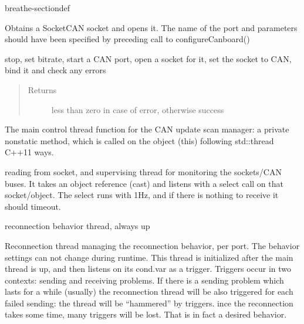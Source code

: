 \documentclass[a4paper,10pt,english]{sphinxmanual}
\begin{document}
\begin{fulllineitems}
\begin{sphinxuseclass}{breathe-sectiondef}
\begin{fulllineitems}
\end{fulllineitems}



\begin{fulllineitems}
%
\pysigstartmultiline
{}%
\pysigstopmultiline
\sphinxAtStartPar
Obtains a SocketCAN socket and opens it. The name of the port and parameters should have been specified by preceding call to configureCanboard()

\sphinxAtStartPar

stop, set bitrate, start a CAN port, open a socket for it, set the socket to CAN, bind it and check any errors 
\begin{quote}\begin{description}
\item[{Returns}] \leavevmode
\sphinxAtStartPar
less than zero in case of error, otherwise success

\end{description}\end{quote}

\end{fulllineitems}



\begin{fulllineitems}
%
\pysigstartmultiline
{}%
\pysigstopmultiline
\sphinxAtStartPar
The main control thread function for the CAN update scan manager: a private non\sphinxhyphen{}static method, which is called on the object (this) following std::thread C++11 ways.

\sphinxAtStartPar
reading from socket, and supervising thread for monitoring the sockets/CAN buses. It takes an object reference (cast) and listens with a select call on that socket/object. The select runs with 1Hz, and if there is nothing to receive it should timeout. 

\end{fulllineitems}



\begin{fulllineitems}
%
\pysigstartmultiline
{}%
\pysigstopmultiline
\sphinxAtStartPar
reconnection behavior thread, always up

\sphinxAtStartPar
Reconnection thread managing the reconnection behavior, per port. The behavior settings can not change during runtime. This thread is initialized after the main thread is up, and then listens on its cond.var as a trigger. Triggers occur in two contexts: sending and receiving problems. If there is a sending problem which lasts for a while (usually) the reconnection thread will be also triggered for each failed sending: the thread will be “hammered” by triggers. ince the reconnection takes some time, many triggers will be lost. That is in fact a desired behavior.


\end{fulllineitems}
\end{sphinxuseclass}
\end{fulllineitems}
\end{document}
